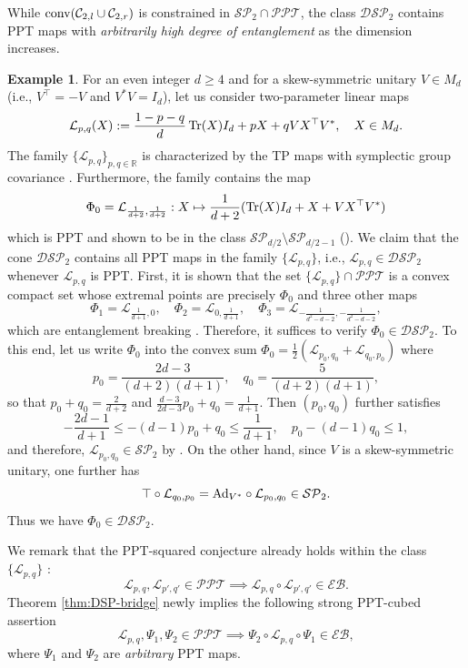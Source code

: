 \documentclass[11pt,reqno]{amsart}
\theoremstyle{definition}
\theoremstyle{definition}
\theoremstyle{definition}
\newtheorem{example}[theorem]{Example}
\theoremstyle{definition}
\newcommand{\Le}{\mathcal{L}}
\newcommand{\Real}{\mathbb{R}}
\newcommand{\SP}{\mathcal{SP}}
\newcommand{\DSP}{\mathcal{DSP}}
\newcommand{\EB}{\mathcal{EB}}
\newcommand{\PPT}{\mathcal{PPT}}
\newcommand{\Ad}{{\rm Ad}}
\begin{document}
While ${\rm conv}(\mathcal{C}_{2,l}\cup \mathcal{C}_{2,r})$ is constrained in $\SP_2\cap \PPT$, the class $\DSP_2$ contains PPT maps with \emph{arbitrarily high degree of entanglement} as the dimension increases.

\begin{example} \label{ex:DSP-Symp}
For an even integer $d\geq 4$ and for a skew-symmetric unitary $V\in M_d$ (i.e., $V^{\top}=-V$ and $V^*V=I_d$), let us consider two-parameter linear maps
\begin{equation} \label{eq:SympCov}
    \Le_{p,q}(X):=\frac{1-p-q}{d}\Tr(X)I_d + pX + qVX^{\top} V^*, \quad X\in M_d.
\end{equation}
The family $\{\Le_{p,q}\}_{p,q\in \Real}$ is characterized by the TP maps with symplectic group covariance \cite{Par26}. Furthermore, the family contains the map
    $$\Phi_0=\Le_{\frac{1}{d+2},\frac{1}{d+2}}:X\mapsto \frac{1}{d+2}(\Tr(X)I_d+X+VX^{\top}V^*)$$
which is PPT and shown to be in the class $\SP_{d/2}\setminus \SP_{d/2-1}$ (\cite[Corollary 4.3]{Par26}). We claim that the cone $\DSP_2$ contains all PPT maps in the family $\{\Le_{p,q}\}$, i.e.,  $\Le_{p,q}\in \DSP_2$ whenever $\Le_{p,q}$ is PPT. First, it is shown that the set $\{\Le_{p,q}\}\cap \PPT$ is a convex compact set whose extremal points are precisely $\Phi_0$ and three other maps
    $$\Phi_1= \Le_{\frac{1}{d+1},0}, \quad \Phi_2= \Le_{0,\frac{1}{d+1}}, \quad \Phi_3=\Le_{-\frac{1}{d^2-d-2},-\frac{1}{d^2-d-2}},$$
which are entanglement breaking \cite[Theorem 4.1]{Par26}. Therefore, it suffices to verify $\Phi_0\in \DSP_2$. To this end, let us write $\Phi_0$ into the convex sum $\Phi_0 = \frac{1}{2}(\Le_{p_0,q_0}+\Le_{q_0,p_0})$ where
    $$p_0=\frac{2d-3}{(d+2)(d+1)},\quad q_0 = \frac{5}{(d+2)(d+1)},$$
so that $p_0+q_0=\frac{2}{d+2}$ and $\frac{d-3}{2d-3}p_0+q_0=\frac{1}{d+1}$. Then $(p_0, q_0)$ further satisfies
    $$-\frac{2d-1}{d+1}\leq -(d-1)p_0+q_0\leq \frac{1}{d+1}, \quad p_0-(d-1)q_0\leq 1,$$
and therefore, $\Le_{p_0,q_0}\in \SP_2$ by \cite[Theorem 4.2]{Par26}. On the other hand, since $V$ is a skew-symmetric unitary, one further has
    $$\top \circ \Le_{q_0,p_0} = \Ad_{V^*} \circ \Le_{p_0,q_0} \in \SP_2.$$
Thus we have $\Phi_0\in \DSP_2$.

We remark that the PPT-squared conjecture already holds within the class $\{\Le_{p,q}\}$ \cite{Pru25,Par26}:
    $$\Le_{p,q},\Le_{p',q'}\in \PPT \implies \Le_{p,q}\circ \Le_{p',q'}\in \EB.$$
Theorem \ref{thm:DSP-bridge} newly implies the following strong PPT-cubed assertion
    $$\Le_{p,q},\Psi_1,\Psi_2\in \PPT \implies \Psi_2\circ \Le_{p,q}\circ \Psi_1\in \EB,$$
where $\Psi_1$ and $\Psi_2$ are \emph{arbitrary} PPT maps.
\end{example}
\end{document}

